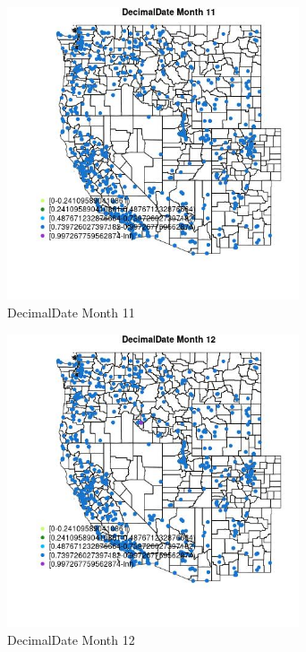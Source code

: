 \begin{figure} 
\centering  
\includegraphics[width=0.77\textwidth]{Code_Outputs/Report_ML_input_PM25_Step4_part_e_de_duplicated_aveswNAs_MapObsMo11DecimalDate.jpg} 
\caption{\label{fig:Report_ML_input_PM25_Step4_part_e_de_duplicated_aveswNAsMapObsMo11DecimalDate}DecimalDate Month 11} 
\end{figure} 
 

\begin{figure} 
\centering  
\includegraphics[width=0.77\textwidth]{Code_Outputs/Report_ML_input_PM25_Step4_part_e_de_duplicated_aveswNAs_MapObsMo12DecimalDate.jpg} 
\caption{\label{fig:Report_ML_input_PM25_Step4_part_e_de_duplicated_aveswNAsMapObsMo12DecimalDate}DecimalDate Month 12} 
\end{figure} 
 
